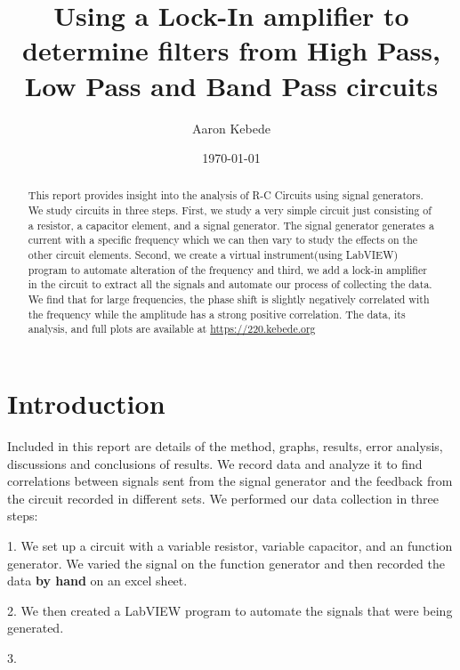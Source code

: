 \documentclass[a4paper]{article}\usepackage[english]{babel}
\title{Using a Lock-In amplifier to determine filters from High Pass, Low Pass and Band Pass circuits }
\author{Aaron Kebede}
\date{\today}
\begin{document}
\maketitle
\begin{abstract}

This report provides insight into the analysis of R-C Circuits using signal generators. We study circuits in three steps. First, we study a very simple circuit just consisting of a resistor, a capacitor element, and a signal generator. The signal generator generates a current with a specific frequency which we can then vary to study the effects on the other circuit elements. Second, we create a virtual instrument(using LabVIEW) program to automate alteration of the frequency and third, we add a lock-in amplifier in the circuit to extract all the signals and automate our process of collecting the data. We find that for large frequencies, the phase shift is slightly negatively correlated with the frequency while the amplitude has a strong positive correlation. The data, its analysis, and full plots are available at \url{https://220.kebede.org}

\end{abstract}

\section{Introduction}

Included in this report are details of the method, graphs, results, error analysis, discussions and conclusions of results. We record data and analyze it to find correlations between signals sent from the signal generator and the feedback from the circuit recorded in different sets.  
\newline
\newline
We performed our data collection in three steps:
\newline
\begin{Steps}
 \item{1. We set up a circuit with a variable resistor, variable capacitor, and  an function generator. We varied the signal on the function generator and then recorded the data \textbf{by hand} on an excel sheet.} \newline{}
 \item{2. We then created a LabVIEW program to automate the signals that were being generated. } \newline{}
 \item{3. }
 
\end{Steps}
\end{document}
